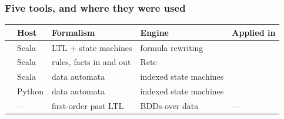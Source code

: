 \begin{frame}
  \frametitle{Five tools, and where they were used} \small

\begin{center}\scriptsize
\renewcommand{\arraystretch}{1.35}
\setlength{\tabcolsep}{4pt}
\begin{tabular}{|l|l|>{\raggedright\arraybackslash}p{2.35cm}%
                    |>{\raggedright\arraybackslash}p{2.1cm}%
                    |>{\raggedright\arraybackslash}p{2.1cm}|}
\hline
\rowcolor{blue!10}
& {\bf Host} & {\bf Formalism} & {\bf Engine} & {\bf Applied in}\\
\hline
\ours{\tc{}}         & Scala  & LTL + state machines    & formula rewriting       & \ladee{}\\
\hline
\ours{\logfire{}}    & Scala  & rules, facts in and out & Rete                    & \msl{}\\
\hline
\ours{\daut{}}       & Scala  & data automata           & indexed state machines  & \msnEndurance{}\\
\hline
\ours{\pycontract{}} & Python & data automata           & indexed state machines  & \msnEndurance{}
                                                                             \clipper{}\\
\hline
\ours{\dejavu{}}     & ---    & first-order past LTL    & BDDs over data          & ---\\
\hline
\end{tabular}
\end{center}


\end{frame}
